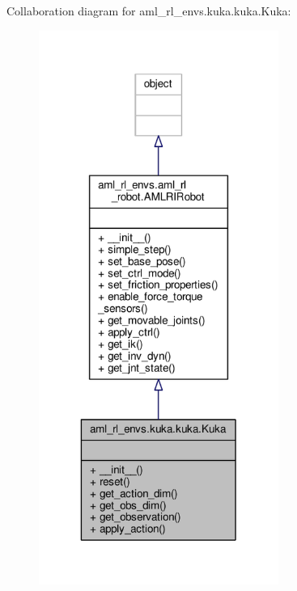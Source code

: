 Collaboration diagram for aml\-\_\-rl\-\_\-envs.\-kuka.\-kuka.\-Kuka\-:
\nopagebreak
\begin{figure}[H]
\begin{center}
\leavevmode
\includegraphics[width=222pt]{classaml__rl__envs_1_1kuka_1_1kuka_1_1_kuka__coll__graph}
\end{center}
\end{figure}
